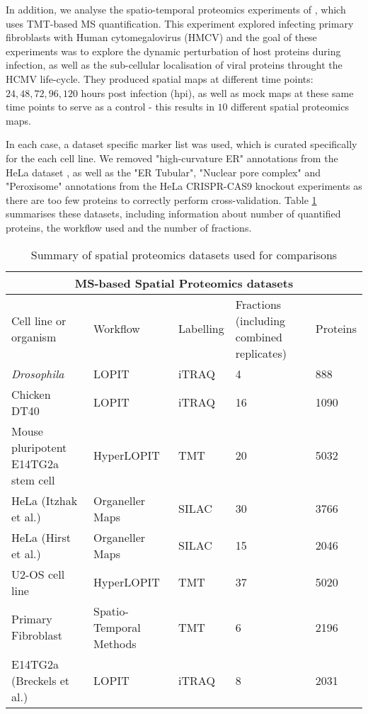 \documentclass[10pt,letterpaper]{article}\usepackage[]{graphicx}\usepackage[]{color}
\begin{document}
In addition, we analyse the spatio-temporal proteomics experiments of
\cite{Jean_Beltran:2016}, which uses TMT-based MS quantification. This
experiment explored infecting primary fibroblasts with Human
cytomegalovirus (HMCV) and the goal of these experiments was to
explore the dynamic perturbation of host proteins during infection, as
well as the sub-cellular localisation of viral proteins throught the
HCMV life-cycle. They produced spatial maps at different time points:
$24,48,72,96,120$ hours post infection (hpi), as well as mock maps at
these same time points to serve as a control - this results in $10$
different spatial proteomics maps.

In each case, a dataset specific marker list was used, which is
curated specifically for the each cell line. We removed
"high-curvature ER" annotations from the HeLa dataset
\cite{Itzhak:2016}, as well as the "ER Tubular", "Nuclear pore
complex" and "Peroxisome" annotations from the HeLa CRISPR-CAS9
knockout experiments \cite{Hirst:2018} as there are too few proteins
to correctly perform cross-validation. Table \ref{table:data}
summarises these datasets, including information about number of
quantified proteins, the workflow used and the number of fractions.

\begin{table}[h]
\centering
\begin{tabular}{ |p{3cm}|p{3cm}|p{2cm}|p{2cm}|p{2cm}|  }
 \hline

 \multicolumn{5}{|c|}{MS-based Spatial Proteomics datasets} \\
 \hline
 Cell line or organism & Workflow & Labelling & Fractions (including combined replicates) & Proteins \\
 \hline
 \hline
 \textit{Drosophila}   &  LOPIT & iTRAQ & 4  & 888\\
 \hline
 Chicken DT40 & LOPIT  & iTRAQ & 16 & 1090 \\
 \hline
 Mouse pluripotent E14TG2a stem cell  &  HyperLOPIT & TMT & 20 & 5032\\
 \hline
 HeLa (Itzhak et al.) & Organeller Maps & SILAC & 30 & 3766\\
 \hline
 HeLa (Hirst et al.) & Organeller Maps  & SILAC & 15 & 2046\\
 \hline
 U2-OS cell line & HyperLOPIT  & TMT & 37 & 5020\\
 \hline
 Primary Fibroblast & Spatio-Temporal Methods & TMT & 6 & 2196 \\
 \hline
 E14TG2a (Breckels et al.)  &  LOPIT & iTRAQ & 8 & 2031\\
\hline
\end{tabular}
\caption{Summary of spatial proteomics datasets used for comparisons}
\label{table:data}
\end{table}
\end{document}
